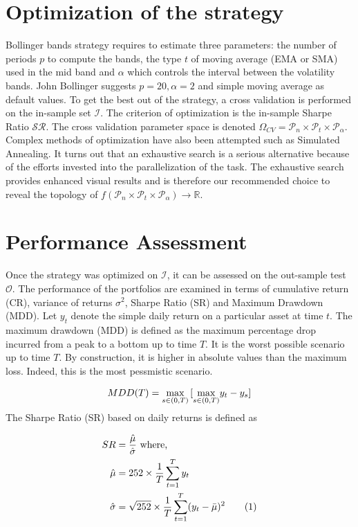 \documentclass[11pt,a4,twosided,singlespacing,titlepagenumber=on]{scrreprt}
\numberwithin{equation}{chapter} %
\theoremstyle{remark}
\newcommand\numberthis{\addtocounter{equation}{1}\tag{\theequation}}
\begin{document}
\section{Optimization of the strategy}
\label{sec:optimization_strategy}
Bollinger bands strategy requires to estimate three parameters: the number of periods $p$ to compute the bands, the type $t$ of moving average (EMA or SMA) used in the mid band and $\alpha$ which controls the interval between the volatility bands. John Bollinger suggests $p = 20, \alpha = 2$ and simple moving average as default values. To get the best out of the strategy, a cross validation is performed on the in-sample set $\mathcal{I}$. The criterion of optimization is the in-sample Sharpe Ratio $\mathcal{SR}$. The cross validation parameter space is denoted  $\Omega_{CV} = \mathcal{P}_n \times \mathcal{P}_t \times \mathcal{P}_\alpha$. Complex methods of optimization have also been attempted such as Simulated Annealing. It turns out that an exhaustive search is a serious alternative because of the efforts invested into the parallelization of the task. The exhaustive search provides enhanced visual results and is therefore our recommended choice to reveal the topology of $f(\mathcal{P}_n \times \mathcal{P}_t \times \mathcal{P}_\alpha) \rightarrow \mathbb{R}$.
 
\section{Performance Assessment}
Once the strategy was optimized on $\mathcal{I}$, it can be assessed on the out-sample test $\mathcal{O}$. The performance of the portfolios are examined in terms of cumulative return (CR), variance of returns $\sigma^2$, Sharpe Ratio (SR) and Maximum Drawdown (MDD). Let $y_t$ denote the simple daily return on a particular asset at time $t$. The maximum drawdown (MDD) is defined as the maximum percentage drop incurred from a peak to a bottom up to time $T$. It is the worst possible scenario up to time $T$. By construction, it is higher in absolute values than the maximum loss. Indeed, this is the most pessmistic scenario.

\begin{equation}
MDD(T) = \smash{\displaystyle\max_{s \in (0,T)}} \left[\smash{\displaystyle\max_{s \in (0,T)}} y_t - y_s \right] 
\end{equation}

The Sharpe Ratio (SR) based on daily returns is defined as

\begin{align*}
SR            &=  \frac{\hat{\mu}}{\hat{\sigma}} \text{ where, } \\
\hat{\mu}     &=  252  \times \frac{1}{T} \sum_{t=1}^T y_t \\
\hat{\sigma}  &= \sqrt{252} \times \frac{1}{T} \sum_{t=1}^T (y_t - \bar{\mu})^2 \numberthis \label{sharpe_ratio_def}
\end{align*}
\end{document}
